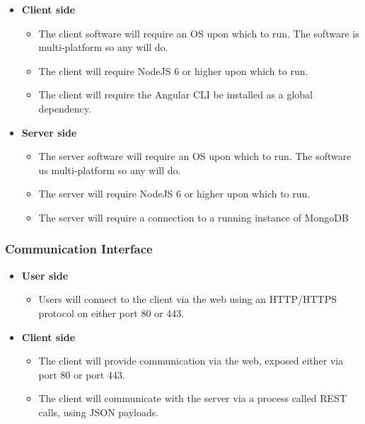 \documentclass[a4paper,12pt]{article}
\begin{document}
	        \begin{itemize}
	        	\item \textbf{Client side}
	        	\begin{itemize}
	        		\item The client software will require an OS upon which to run. The software is multi-platform so any will do.
	        		\item The client will require NodeJS 6 or higher upon which to run.
	        		\item The client will require the Angular CLI be installed as a global dependency.
	        	\end{itemize}
	        \end{itemize}
        
        	\begin{itemize}
        		\item \textbf{Server side}
        		\begin{itemize}
        			\item The server software will require an OS upon which to run. The software us multi-platform so any will do.
        			\item The server will require NodeJS 6 or higher upon which to run.
        			\item The server will require a connection to a running instance of MongoDB
        		\end{itemize}
        	\end{itemize}
            
            \subsubsection{Communication Interface}
            
           	\begin{itemize}
            	\item \textbf{User side}
            	\begin{itemize}
            		\item Users will connect to the client via the web using an HTTP/HTTPS protocol on either port 80 or 443.
            	\end{itemize}
            \end{itemize}
            
            \begin{itemize}
            	\item \textbf{Client side}
            	\begin{itemize}
            		\item The client will provide communication via the web, exposed either via port 80 or port 443.
            		\item The client will communicate with the server via a process called REST calls, using JSON payloads.
            	\end{itemize}
            \end{itemize}
            
\end{document}
